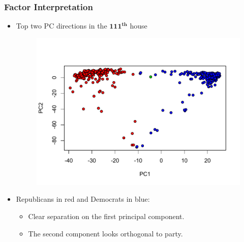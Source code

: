 \documentclass[
  shownotes,
  xcolor={svgnames},
  hyperref={colorlinks,citecolor=DarkBlue,linkcolor=DarkRed,urlcolor=DarkBlue}
  , aspectratio=169]{beamer}
\newcommand{\bs}[1]{\boldsymbol{#1}}
\begin{document}
\begin{frame}[fragile]
\frametitle{Factor Interpretation}

\begin{itemize}
\item Top two PC directions in the $\bs{111^{th}}$ house



  \begin{figure}[H] \centering
            \captionsetup{justification=centering}
              \includegraphics[scale=.5]{../Lecture26/figures/VOTEpc}
 \end{figure}




  \item Republicans in red and Democrats in blue: 
  \begin{itemize}
  \item Clear separation on the first principal component.
  \item The second component looks orthogonal to party.
  \end{itemize}
\end{itemize}


\end{frame}
\end{document}
